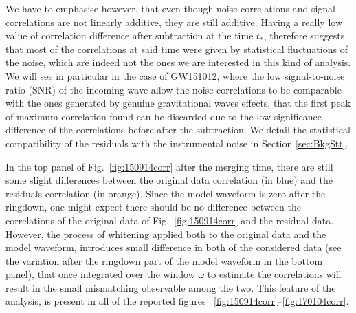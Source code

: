 \documentclass[a4paper,11pt]{article}
\begin{document}
We have to emphasise however, that even though noise correlations and signal correlations are not linearly additive, they are still additive. Having a really low value of correlation difference after subtraction at the time $t_*$, therefore suggests that most of the correlations at said time were given by statistical fluctuations of the noise, which are indeed not the ones we are interested in this kind of analysis. We will see in particular in the case of GW151012, where the low signal-to-noise ratio (SNR) of the incoming wave allow the noise correlations to be comparable with the ones generated by genuine gravitational waves effects, that the first peak of maximum correlation found can be discarded due to the low significance difference of the correlations before after the subtraction. We detail the  statistical compatibility of the residuals with the instrumental noise in Section \ref{sec:BkgStt}.

In the top panel of Fig.~\ref{fig:150914corr} after the merging time, there are still some slight differences between the original data correlation (in blue) and the residuals correlation (in orange).
Since the model waveform is zero after the ringdown, one might expect there should be no difference between the correlations of the original data of Fig.~\ref{fig:150914corr} and the residual data. However, the process of whitening applied both to the original data and the model waveform, introduces small difference in both of the considered data (see the variation after the ringdown part of the model waveform in the bottom panel), that once integrated over the window $\omega$ to estimate the correlations will result in the small mismatching observable among the two. This feature of the analysis, is present in all of the reported figures ~\ref{fig:150914corr}--\ref{fig:170104corr}.\\
\end{document}
